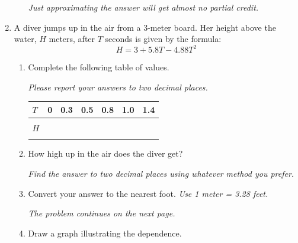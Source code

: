 \documentclass[12pt]{article}
\begin{document}
\begin{enumerate}
\begin{enumerate}
\emph{Just approximating the answer will get almost no partial credit.}

\vfill
\vfill
\vfill
\end{enumerate}

\newpage %

\item A diver jumps up in the air from a 3-meter board.  Her height above the water, $H$ meters, after $T$ seconds is given by the formula: $$H = 3 + 5.8T - 4.88T^2$$

\begin{enumerate}
\item Complete the following table of values.

\emph{Please report your answers to two decimal places.}

\begin{center}
\begin{tabular} {|l|c|c|c|c|c|c|} \hline
$T$ & 0 & 0.3 & 0.5 & 0.8 & 1.0 & 1.4 \\ \hline
&&&&&& \\
$H$ & \hspace{.7in} & \hspace{.7in}  & \hspace{.7in}  & \hspace{.7in}  & \hspace{.7in}  & \hspace{.7in}  \\
&&&&&& \\ \hline
\end{tabular}
\end{center}

\item How high up in the air does the diver get?

\emph{Find the answer to two decimal places using whatever method you prefer.}
\vfill
\vfill

\item Convert your answer to the nearest foot.  \emph{Use 1 meter = 3.28 feet.}
\vfill

\hspace{-.5in} \emph{The problem continues on the next page.}

\newpage %

\item Draw a graph illustrating the dependence.


\end{enumerate}
\end{enumerate}
\end{document}
